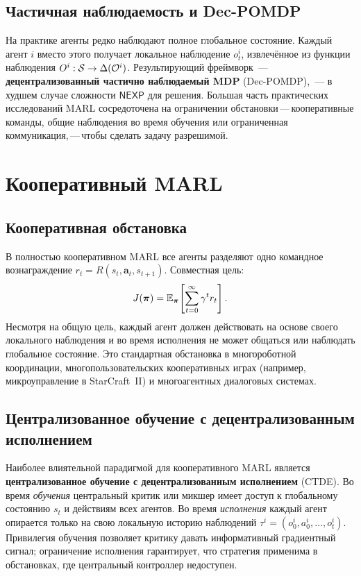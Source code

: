 \subsection{Частичная наблюдаемость и Dec-POMDP}

На практике агенты редко наблюдают полное глобальное состояние. Каждый агент
$i$ вместо этого получает локальное наблюдение $o^i_t$, извлечённое из
функции наблюдения $O^i : \mathcal{S} \to \Delta(\mathcal{O}^i)$. Результирующий
фреймворк~--- \textbf{децентрализованный частично наблюдаемый
MDP} (Dec-POMDP),~--- в худшем случае сложности $\mathsf{NEXP}$
для решения. Большая часть практических исследований MARL сосредоточена на
ограничении обстановки\,---\,кооперативные команды, общие наблюдения
во время обучения или ограниченная коммуникация,\,---\,чтобы сделать задачу
разрешимой.

\section{Кооперативный MARL}
\label{sec:cooperative}

\subsection{Кооперативная обстановка}

В полностью кооперативном MARL все агенты разделяют одно командное вознаграждение
$r_t = R(s_t, \bm{a}_t, s_{t+1})$. Совместная цель:
\begin{equation}
\label{eq:cooperative-return}
J(\boldsymbol{\pi}) = \operatorname{\mathbb{E}}_{\boldsymbol{\pi}}\!\left[
  \sum_{t=0}^{\infty} \gamma^t r_t \right].
\end{equation}
Несмотря на общую цель, каждый агент должен действовать на основе своего
локального наблюдения и во время исполнения не может общаться или
наблюдать глобальное состояние. Это стандартная обстановка в
многороботной координации, многопользовательских кооперативных играх (например,
микроуправление в StarCraft~II) и многоагентных диалоговых системах.

\subsection{Централизованное обучение с децентрализованным исполнением}

Наиболее влиятельной парадигмой для кооперативного MARL является
\textbf{централизованное обучение с децентрализованным
исполнением}
(CTDE).
Во время \emph{обучения} центральный критик или микшер имеет доступ к
глобальному состоянию $s_t$ и действиям всех агентов. Во время
\emph{исполнения} каждый агент опирается только на свою локальную историю наблюдений
$\tau^i = (o^i_0, a^i_0, \ldots, o^i_t)$. Привилегия обучения позволяет критику
давать информативный градиентный сигнал; ограничение исполнения гарантирует,
что стратегия применима в обстановках, где центральный
контроллер недоступен.


